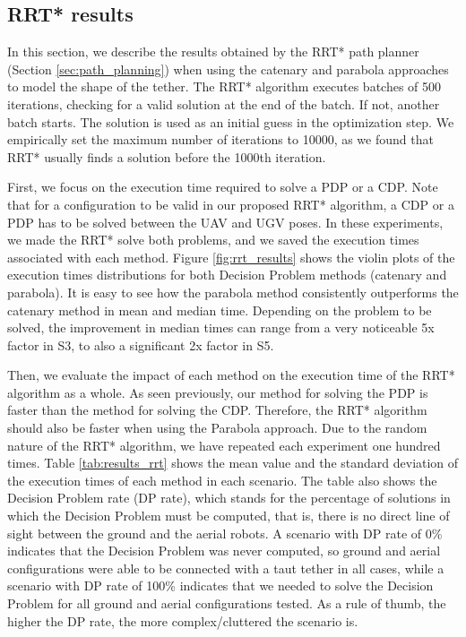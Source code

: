 \subsection{RRT* results}

In this section, we describe the results obtained by the RRT* path planner (Section \ref{sec:path_planning}) when using the catenary and parabola approaches to model the shape of the tether. 
The RRT* algorithm executes batches of 500 iterations, checking for a valid solution at the end of the batch. If not, another batch starts. The solution is used as an initial guess in the optimization step. We empirically set the maximum number of iterations to 10000, as we found that RRT* usually finds a solution before the 1000th iteration.  

First, we focus on the execution time required to solve a PDP or a CDP. Note that for a configuration to be valid in our proposed RRT* algorithm, a CDP or a PDP has to be solved between the UAV and UGV poses. In these experiments, we made the RRT* solve both problems, and we saved the execution times associated with each method. Figure \ref{fig:rrt_results} shows the violin plots of the execution times distributions for both Decision Problem methods (catenary and parabola). It is easy to see how the parabola method consistently outperforms the catenary method in mean and median time. Depending on the problem to be solved, the improvement in median times can range from a very noticeable 5x factor in S3, to also a significant 2x factor in S5.

Then, we evaluate the impact of each method on the execution time of the RRT* algorithm as a whole. As seen previously, our method for solving the PDP is faster than the method for solving the CDP. Therefore, the RRT* algorithm should also be faster when using the Parabola approach. Due to the random nature of the RRT* algorithm, we have repeated each experiment one hundred times. Table \ref{tab:results_rrt} shows the mean value and the standard deviation of the execution times of each method in each scenario. The table also shows the Decision Problem rate (DP rate), which stands for the percentage of solutions in which the Decision Problem must be computed, that is, there is no direct line of sight between the ground and the aerial robots. A scenario with DP rate of 0\% indicates that the Decision Problem was never computed, so ground and aerial configurations were able to be connected with a taut tether in all cases, while a scenario with DP rate of 100\% indicates that we needed to solve the Decision Problem for all ground and aerial configurations tested. As a rule of thumb, the higher the DP rate, the more complex/cluttered the scenario is.

